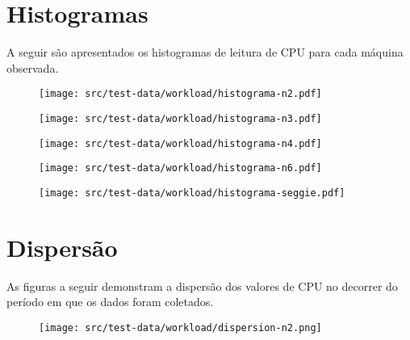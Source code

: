 \apendice

\chapter{Histogramas}\label{chap:histogramas}

A seguir são apresentados os histogramas de leitura de CPU para cada
máquina observada.

\begin{figure}[htp]
\centering
\texttt{[image: src/test-data/workload/histograma-n2.pdf]}
\label{fig:histn2}
\end{figure}

\begin{figure}[htp]
\centering
\texttt{[image: src/test-data/workload/histograma-n3.pdf]}
\label{fig:histn3}
\end{figure}

\begin{figure}[htp]
\centering
\texttt{[image: src/test-data/workload/histograma-n4.pdf]}
\label{fig:histn4}
\end{figure}

\begin{figure}[htp]
\centering
\texttt{[image: src/test-data/workload/histograma-n6.pdf]}
\label{fig:histn6}
\end{figure}

\begin{figure}[htp]
\centering
\texttt{[image: src/test-data/workload/histograma-seggie.pdf]}
\label{fig:histseggie}
\end{figure}

\chapter{Dispersão}

As figuras a seguir demonstram a dispersão dos valores de CPU no decorrer
do período em que os dados foram coletados.

\begin{figure}[htp]
\centering
\texttt{[image: src/test-data/workload/dispersion-n2.png]}
\label{fig:appdispn2}
\end{figure}

